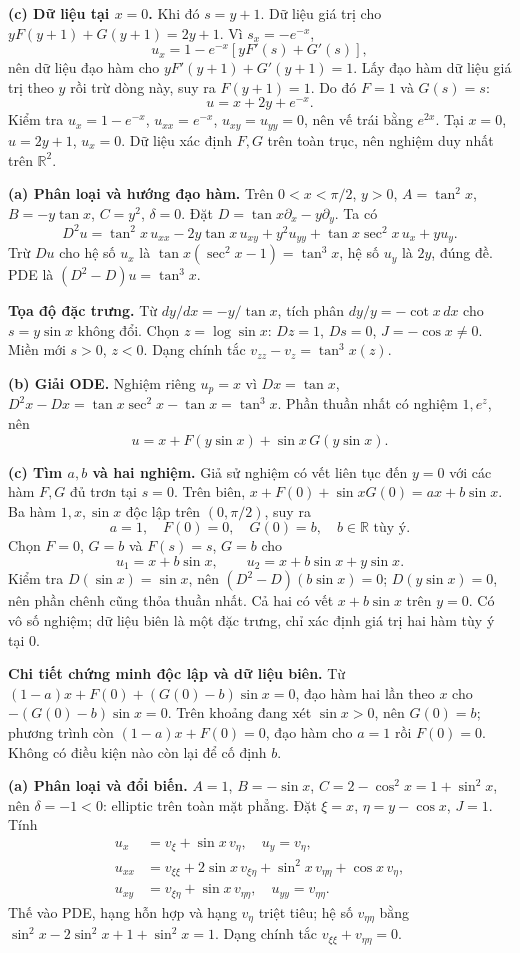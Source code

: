 \textbf{(c) Dữ liệu tại $x=0$.} Khi đó $s=y+1$. Dữ liệu giá trị cho $yF(y+1)+G(y+1)=2y+1$. Vì $s_x=-e^{-x}$,
\[u_x=1-e^{-x}[yF'(s)+G'(s)],\]
nên dữ liệu đạo hàm cho $yF'(y+1)+G'(y+1)=1$. Lấy đạo hàm dữ liệu giá trị theo $y$ rồi trừ dòng này, suy ra $F(y+1)=1$. Do đó $F=1$ và $G(s)=s$:
\[\boxed{u=x+2y+e^{-x}.}\]
Kiểm tra $u_x=1-e^{-x}$, $u_{xx}=e^{-x}$, $u_{xy}=u_{yy}=0$, nên vế trái bằng $e^{2x}$. Tại $x=0$, $u=2y+1$, $u_x=0$. Dữ liệu xác định $F,G$ trên toàn trục, nên nghiệm duy nhất trên $\mathbb R^2$.

\textbf{(a) Phân loại và hướng đạo hàm.} Trên $0<x<\pi/2$, $y>0$, $A=\tan^2x$, $B=-y\tan x$, $C=y^2$, $\delta=0$. Đặt $D=\tan x\partial_x-y\partial_y$. Ta có
\[D^2u=\tan^2x\,u_{xx}-2y\tan x\,u_{xy}+y^2u_{yy}
+\tan x\sec^2x\,u_x+y u_y.\]
Trừ $Du$ cho hệ số $u_x$ là $\tan x(\sec^2x-1)=\tan^3x$, hệ số $u_y$ là $2y$, đúng đề. PDE là $(D^2-D)u=\tan^3x$.

\textbf{Tọa độ đặc trưng.} Từ $dy/dx=-y/\tan x$, tích phân $dy/y=-\cot x\,dx$ cho $s=y\sin x$ không đổi. Chọn $z=\log\sin x$: $Dz=1$, $Ds=0$, $J=-\cos x\ne0$. Miền mới $s>0$, $z<0$. Dạng chính tắc $v_{zz}-v_z=\tan^3x(z)$.

\textbf{(b) Giải ODE.} Nghiệm riêng $u_p=x$ vì $Dx=\tan x$, $D^2x-Dx=\tan x\sec^2x-\tan x=\tan^3x$. Phần thuần nhất có nghiệm $1,e^z$, nên
\[\boxed{u=x+F(y\sin x)+\sin x\,G(y\sin x).}\]

\textbf{(c) Tìm $a,b$ và hai nghiệm.} Giả sử nghiệm có vết liên tục đến $y=0$ với các hàm $F,G$ đủ trơn tại $s=0$. Trên biên, $x+F(0)+\sin xG(0)=ax+b\sin x$. Ba hàm $1,x,\sin x$ độc lập trên $(0,\pi/2)$, suy ra
\[\boxed{a=1,\quad F(0)=0,\quad G(0)=b,\quad b\in\mathbb R\text{ tùy ý}.}\]
Chọn $F=0$, $G=b$ và $F(s)=s$, $G=b$ cho
\[u_1=x+b\sin x,\qquad u_2=x+b\sin x+y\sin x.\]
Kiểm tra $D(\sin x)=\sin x$, nên $(D^2-D)(b\sin x)=0$; $D(y\sin x)=0$, nên phần chênh cũng thỏa thuần nhất. Cả hai có vết $x+b\sin x$ trên $y=0$. Có vô số nghiệm; dữ liệu biên là một đặc trưng, chỉ xác định giá trị hai hàm tùy ý tại $0$.

\textbf{Chi tiết chứng minh độc lập và dữ liệu biên.} Từ $(1-a)x+F(0)+(G(0)-b)\sin x=0$, đạo hàm hai lần theo $x$ cho $-(G(0)-b)\sin x=0$. Trên khoảng đang xét $\sin x>0$, nên $G(0)=b$; phương trình còn $(1-a)x+F(0)=0$, đạo hàm cho $a=1$ rồi $F(0)=0$. Không có điều kiện nào còn lại để cố định $b$.

\textbf{(a) Phân loại và đổi biến.} $A=1$, $B=-\sin x$, $C=2-\cos^2x=1+\sin^2x$, nên $\delta=-1<0$: elliptic trên toàn mặt phẳng. Đặt $\xi=x$, $\eta=y-\cos x$, $J=1$. Tính
\begin{align*}
u_x&=v_\xi+\sin x\,v_\eta,\quad u_y=v_\eta,\\
u_{xx}&=v_{\xi\xi}+2\sin x\,v_{\xi\eta}+\sin^2x\,v_{\eta\eta}+\cos x\,v_\eta,\\
u_{xy}&=v_{\xi\eta}+\sin x\,v_{\eta\eta},\quad u_{yy}=v_{\eta\eta}.
\end{align*}
Thế vào PDE, hạng hỗn hợp và hạng $v_\eta$ triệt tiêu; hệ số $v_{\eta\eta}$ bằng $\sin^2x-2\sin^2x+1+\sin^2x=1$. Dạng chính tắc $v_{\xi\xi}+v_{\eta\eta}=0$.

